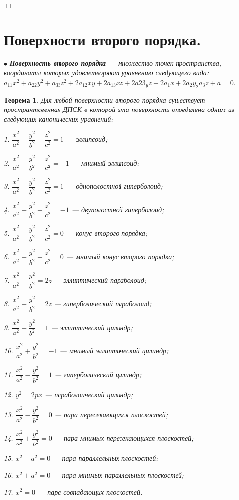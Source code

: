 \documentclass[a4paper, 12pt]{report}
\newenvironment{examp} %
{\par\noindent{\textbf{\textsc{Пример:}}}} %
{\hfill$\scriptstyle\Box$}
\begin{document}
\begin{examp}
\begin{center}
	\end{center}
\end{examp}






\section{Поверхности второго порядка.}

$\bullet$ \textit{\textbf{Поверхность второго порядка} --- множество точек пространства, координаты которых удовлетворяют уравнению следующего вида: $a_{11}x^2 + a_{22}y^2 + a_{33}z^2 + 2a_{12}xy + 2a_{13}xz + 2a{23}_yz + 2a_1x + 2a_2y _ 2a_3z + a = 0$}.
\newtheorem*{th21_1}{Теорема}\begin{th21_1}Для любой поверхности второго порядка существует пространтсвенная ДПСК в которой эта поверхность определена одним из следующих канонических уравнений:
	
	1. $\dfrac{x^2}{a^2} + \dfrac{y^2}{b^2} + \dfrac{z^2}{c^2} = 1$ --- эллипсоид;
	
	2. $\dfrac{x^2}{a^2} + \dfrac{y^2}{b^2} + \dfrac{z^2}{c^2} = -1$ --- мнимый эллипсоид;
	
	3. $\dfrac{x^2}{a^2} + \dfrac{y^2}{b^2} - \dfrac{z^2}{c^2} = 1$ --- однополостной гиперболоид;
	
	4. $\dfrac{x^2}{a^2} + \dfrac{y^2}{b^2} - \dfrac{z^2}{c^2} = -1$ --- двуполостной гиперболоид;
	
	5. $\dfrac{x^2}{a^2} + \dfrac{y^2}{b^2} - \dfrac{z^2}{c^2} = 0$ --- конус второго порядка;
	
	6. $\dfrac{x^2}{a^2} + \dfrac{y^2}{b^2} + \dfrac{z^2}{c^2} = 0$ --- мнимый конус второго порядка;
	
	7. $\dfrac{x^2}{a^2} + \dfrac{y^2}{b^2} = 2z$ --- эллиптический параболоид;
	
	8. $\dfrac{x^2}{a^2} - \dfrac{y^2}{b^2} = 2z$ --- гиперболический параболоид;
	
	9. $\dfrac{x^2}{a^2} + \dfrac{y^2}{b^2} = 1$ --- эллиптический цилиндр;
	
	10. $\dfrac{x^2}{a^2} + \dfrac{y^2}{b^2} = -1$ --- мнимый эллиптический цилиндр;
	
	11. $\dfrac{x^2}{a^2} - \dfrac{y^2}{b^2} = 1$ --- гиперболический цилиндр;
	
	12. $y^2 = 2px$ --- параболоический цилиндр;
	
	13. $\dfrac{x^2}{a^2} - \dfrac{y^2}{b^2} = 0$ --- пара пересекающихся плоскостей;
	
	14. $\dfrac{x^2}{a^2} + \dfrac{y^2}{b^2} = 0$ --- пара мнимых пересекающихся плоскостей;
	
	15. $x^2 - a^2 = 0$ --- пара параллельных плоскостей;
	
	16. $x^2 + a^2 = 0$ --- пара мнимых параллельных плоскостей;
	
	17. $x^2 = 0$ --- пара совпадающих плоскостей.
\end{th21_1}
\end{document}
